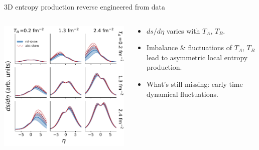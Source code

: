 \documentclass[11pt]{beamer}
\begin{document}
\begin{frame}{3D entropy production reverse engineered from data}

\begin{columns}
\begin{column}{0.55\textwidth}
\includegraphics[width=\textwidth]{post_dsdy.pdf}
\end{column}
\begin{column}{0.45\textwidth}
\begin{itemize}
\item $ds/d\eta$ varies with $T_A$, $T_B$.
\item Imbalance \& fluctuations of $T_A$, $T_B$ lead to asymmetric local entropy production.
\item What's still missing: early time dynamical fluctuations.
\end{itemize}
\end{column}
\end{columns}

\end{frame}
\end{document}
